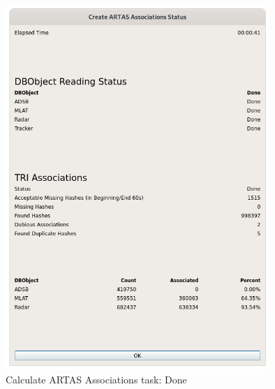 \begin{figure}[H]
  \center
    \includegraphics[width=10cm]{../screenshots/artas_assoc_done.png}
  \caption{Calculate ARTAS Associations task: Done}
\end{figure}


